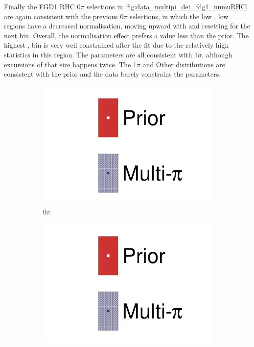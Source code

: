 Finally the FGD1 \numu RHC 0$\pi$ selections in \autoref{fig:data_multipi_det_fdg1_numuRHC} are again consistent with the previous 0$\pi$ selections, in which the low \cosmu, low \pmu regions have a decreased normalisation, moving upward with \pmu and resetting for the next \cosmu bin. Overall, the normalisation effect prefers a value less than the prior. The highest \cosmu, \pmu bin is very well constrained after the fit due to the relatively high statistics in this region. The parameters are all consistent with 1$\sigma$, although excursions of that size happens twice. The 1$\pi$ and Other distributions are consistent with the prior and the data barely constrains the parameters.
\begin{figure}[h]
	\centering
	\begin{subfigure}[t]{0.32\textwidth}
		\includegraphics[width=\textwidth,page=52, trim={0mm 0mm 0mm 0mm}, clip]{figures/mach3/2018/data/2018a_FixedCov_RedCov_Mpi_Data_merge_drawPar_withDet}
		\caption{0$\pi$}
	\end{subfigure}
	\begin{subfigure}[t]{0.32\textwidth}
		\includegraphics[width=\textwidth,page=53, trim={0mm 0mm 0mm 0mm}, clip]{figures/mach3/2018/data/2018a_FixedCov_RedCov_Mpi_Data_merge_drawPar_withDet}

\end{subfigure}
\end{figure}
